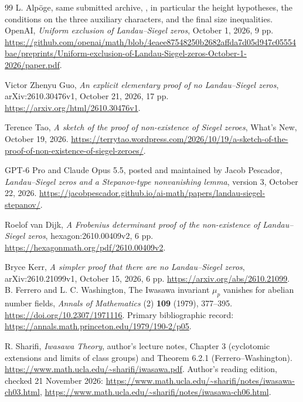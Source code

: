 \begin{thebibliography}{99}
L. Alp\"oge, same submitted archive,
,
in particular the height hypotheses, the conditions on the
three auxiliary characters, and the final size inequalities.
OpenAI, \emph{Uniform exclusion of Landau--Siegel zeros},
October 1, 2026, 9 pp.
\url{https://github.com/openai/math/blob/4eaee87548250b2682affda7d05d947c05554bae/preprints/Uniform-exclusion-of-Landau-Siegel-zeros-October-1-2026/paper.pdf}.

Victor Zhenyu Guo, \emph{An explicit elementary proof of no Landau--Siegel zeros},
arXiv:2610.30476v1, October 21, 2026, 17 pp.
\url{https://arxiv.org/html/2610.30476v1}.

Terence Tao, \emph{A sketch of the proof of non-existence of Siegel zeroes},
What's New, October 19, 2026.
\url{https://terrytao.wordpress.com/2026/10/19/a-sketch-of-the-proof-of-non-existence-of-siegel-zeroes/}.

GPT-6 Pro and Claude Opus 5.5, posted and maintained by Jacob Pescador,
\emph{Landau--Siegel zeros and a Stepanov-type nonvanishing lemma},
version 3, October 22, 2026.
\url{https://jacobpescador.github.io/ai-math/papers/landau-siegel-stepanov/}.

Roelof van Dijk,
\emph{A Frobenius determinant proof of the non-existence of Landau--Siegel zeros},
hexagon:2610.00409v2, 6 pp.
\url{https://hexagonmath.org/pdf/2610.00409v2}.

Bryce Kerr, \emph{A simpler proof that there are no Landau--Siegel zeros},
arXiv:2610.21099v1, October 15, 2026, 6 pp.
\url{https://arxiv.org/abs/2610.21099}.
B. Ferrero and L. C. Washington,
The Iwasawa invariant $\mu_p$ vanishes for abelian number fields,
\emph{Annals of Mathematics} (2) \textbf{109} (1979), 377--395.
\url{https://doi.org/10.2307/1971116}.
Primary bibliographic record:
\url{https://annals.math.princeton.edu/1979/190-2/p05}.

R. Sharifi, \emph{Iwasawa Theory}, author's lecture notes,
Chapter 3 (cyclotomic extensions and limits of class groups) and
Theorem 6.2.1 (Ferrero--Washington).
\url{https://www.math.ucla.edu/~sharifi/iwasawa.pdf}.
Author's reading edition, checked 21 November 2026:
\url{https://www.math.ucla.edu/~sharifi/notes/iwasawa-ch03.html},
\url{https://www.math.ucla.edu/~sharifi/notes/iwasawa-ch06.html}.






\end{thebibliography}
